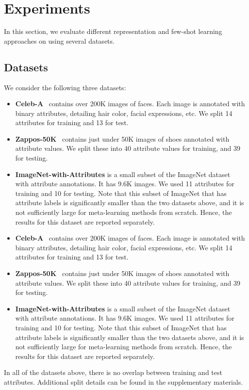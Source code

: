 \savespacebeforesection
\section{Experiments}
\savespacebeforesection
In this section, we evaluate different representation and few-shot learning
approaches on \taskname{} using several datasets. 

\savespacebeforesection
\subsection{Datasets}
\savespacebeforesection
We consider the following three datasets:

\iflatexml
\begin{itemize}
\item \textbf{Celeb-A}~\citep{celeba} contains over 200K images of faces. Each
    image is annotated with binary attributes, detailing hair color, facial
    expressions, etc. We split 14 attributes for training and 13 for test.
\item \textbf{Zappos-50K}~\citep{zappos} contains just under 50K images of
    shoes annotated with attribute values. We split these into 40 attribute
    values for training, and 39 for testing.
\item \textbf{ImageNet-with-Attributes} is a small subset of the ImageNet
    dataset~\citep{deng2009imagenet} with attribute annotations. It has 9.6K
    images. We used 11 attributes for training and 10 for testing. Note that
    this subset of ImageNet that has attribute labels is significantly smaller
    than the two datasets above, and it is not sufficiently large for
    meta-learning methods from scratch.  Hence, the results for this dataset
    are reported separately.
\end{itemize}
\else
\begin{itemize}[leftmargin=*]
\savespacebeforeitem
\item \textbf{Celeb-A}~\citep{celeba} contains over 200K images of faces. Each
    image is annotated with binary attributes, detailing hair color, facial
    expressions, etc. We split 14 attributes for training and 13 for test.
\item \textbf{Zappos-50K}~\citep{zappos} contains just under 50K images of
    shoes annotated with attribute values. We split these into 40 attribute
    values for training, and 39 for testing.
\item \textbf{ImageNet-with-Attributes} is a small subset of the ImageNet
    dataset~\citep{deng2009imagenet} with attribute annotations. It has 9.6K
    images. We used 11 attributes for training and 10 for testing. Note that
    this subset of ImageNet that has attribute labels is significantly smaller
    than the two datasets above, and it is not sufficiently large for
    meta-learning methods from scratch.  Hence, the results for this dataset
    are reported separately.
\end{itemize}
\fi
\savespacebeforesection
In all of the datasets above, there is no overlap between training and test
attributes. Additional split details can be found in the supplementary
materials.

